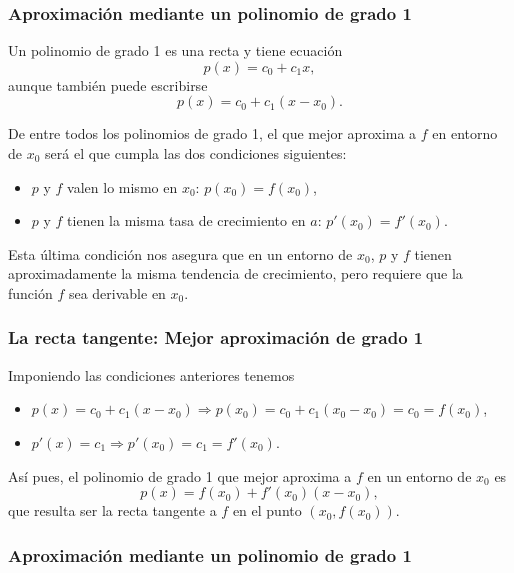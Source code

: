 \begin{frame}
	\frametitle{Aproximación mediante un polinomio de grado 1}
	Un polinomio de grado 1 es una recta y tiene ecuación
	\[
		p(x) = c_0+c_1x,
	\]
	aunque también puede escribirse
	\[
		p(x) = c_0+c_1(x-x_0).
	\]
	
	De entre todos los polinomios de grado 1, el que mejor aproxima a $f$ en entorno de $x_0$ será el que cumpla las dos condiciones siguientes:
	\begin{itemize}
		\item[\structure{1-}] $p$ y $f$ valen lo mismo en $x_0$: $p(x_0) = f(x_0)$,
		\item[\structure{2-}] $p$ y $f$ tienen la misma tasa de crecimiento en $a$: $p'(x_0) = f'(x_0)$.
	\end{itemize}
	Esta última condición nos asegura que en un entorno de $x_0$, $p$ y $f$ tienen aproximadamente la misma tendencia de crecimiento, pero requiere que la función $f$ sea derivable en $x_0$.
\end{frame}


\begin{frame}
	\frametitle{La recta tangente: Mejor aproximación de grado 1}
	Imponiendo las condiciones anteriores tenemos
	\begin{itemize}
		\item[\structure{1-}] $p(x)=c_0+c_1(x-x_0) \Rightarrow p(x_0)=c_0+c_1(x_0-x_0)=c_0=f(x_0)$,
		\item[\structure{2-}] $p'(x)=c_1 \Rightarrow p'(x_0)=c_1=f'(x_0)$.
	\end{itemize}
	
	Así pues, el polinomio de grado 1 que mejor aproxima a $f$ en un entorno de $x_0$ es
	\[
		p(x) = f(x_0)+f '(x_0)(x-x_0),
	\]
	que resulta ser la recta tangente a $f$ en el punto $(x_0,f(x_0))$.
\end{frame}


\begin{frame}
	\frametitle{Aproximación mediante un polinomio de grado 1}
	\begin{center}
		\scalebox{1}{}
	\end{center}
\end{frame}



